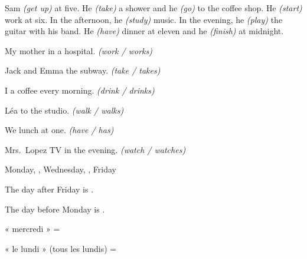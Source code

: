 \begin{anglais}
\begin{tcolorbox}[otBase,colback=otNavyTint,colframe=otNavyTint,fontupper=\fontsize{11}{19}\selectfont]
Sam  \textit{(get up)} at five. He  \textit{(take)} a shower and
he  \textit{(go)} to the coffee shop. He  \textit{(start)} work at six.
In the afternoon, he  \textit{(study)} music. In the evening, he
 \textit{(play)} the guitar with his band. He  \textit{(have)} dinner
at eleven and he  \textit{(finish)} at midnight.
\end{tcolorbox}
\end{anglais}

\begin{questions}
\item My mother  in a hospital. \textit{(work / works)}
\item Jack and Emma  the subway. \textit{(take / takes)}
\item I  a coffee every morning. \textit{(drink / drinks)}
\item Léa  to the studio. \textit{(walk / walks)}
\item We  lunch at one. \textit{(have / has)}
\item Mrs.\ Lopez  TV in the evening. \textit{(watch / watches)}
\end{questions}

\begin{questions}
\item Monday, , Wednesday, , Friday
\item The day after Friday is .
\item The day before Monday is .
\item « mercredi » = 
\item « le lundi » (tous les lundis) = 
\end{questions}

